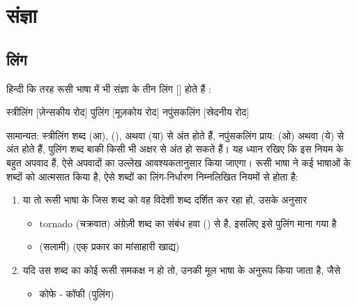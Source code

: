 \chapter{संज्ञा}\label{ch: noun}


\section{लिंग}\label{sec:noun-gender}
हिन्दी कि तरह रूसी भाषा में भी संज्ञा के तीन लिंग []  होते हैं :

स्त्रीलिंग   [ज़ेन्सकीय रोद]
पुलिंग  [मूज़कोय रोद]
नपुंसकलिंग  [स्रेदनीय रोद]

सामान्यत: स्त्रीलिंग शब्द  (आ),  (),  अथवा  (या)  से अंत होते हैं, नपुंसकलिंग प्राय:  (ओ) अथवा
 (ये) से अंत होते हैं, पुलिंग शब्द बाकी किसी भी अक्षर से अंत हो सकते हैं। यह ध्यान रखिए कि इस नियम के बहुत अपवाद हैं, ऐसे अपवादों का उल्लेख
आवश्यकतानुसार किया जाएगा। रूसी भाषा ने कई भाषाओं के शब्दों को आत्मसात किया है, ऐसे शब्दों का लिंग-निर्धारण निम्नलिखित नियमों से होता है:
\begin{enumerate}
    \item या तो रूसी भाषा के जिस शब्द को वह विदेशी शब्द दर्शित कर रहा हो, उसके अनुसार
    \begin{itemize}
        \item tornado (चक्रवात) अंग्रेज़ी शब्द का संबंध हवा () से है, इसलिए इसे पुलिंग माना गया है
        \item (सलामी) (एक् प्रकार का मांसाहारी खाद्य)
    \end{itemize}
    \item  यदि उस शब्द का कोई रूसी समकक्ष न हो तो, उनकी मूल भाषा के अनुरूप किया जाता है, जैसे
    \begin{itemize}
        \item कोफे - कॉफी (पुलिंग)
    \end{itemize}
\end{enumerate}



